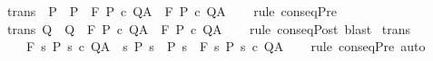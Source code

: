 \begin{isabellebody}
%
\isadelimproof
\isanewline
%
\endisadelimproof
\isanewline
{}\isamarkupfalse%
\ {\isacharbrackleft}trans{\isacharbrackright}\ {\isacharcolon}\ {\isachardoublequoteopen}P{\isacharprime}\ {\isasymsubseteq}\ P\ {\isasymLongrightarrow}\ {\isasymGamma}{\isacharcomma}{\isasymTheta}{\isasymturnstile}\isactrlbsub {\isacharslash}F\isactrlesub \ P\ c\ Q{\isacharcomma}A\ {\isasymLongrightarrow}\ {\isasymGamma}{\isacharcomma}{\isasymTheta}{\isasymturnstile}\isactrlbsub {\isacharslash}F\isactrlesub \ P{\isacharprime}\ c\ Q{\isacharcomma}A{\isachardoublequoteclose}\isanewline
%
\isadelimproof
\ \ %
\endisadelimproof
%
\isatagproof
{}\isamarkupfalse%
\ {\isacharparenleft}rule\ conseqPre{\isacharparenright}%
\endisatagproof
{\isafoldproof}%
%
\isadelimproof
\isanewline
%
\endisadelimproof
\ \isanewline
{}\isamarkupfalse%
\ {\isacharbrackleft}trans{\isacharbrackright}{\isacharcolon}\ {\isachardoublequoteopen}Q\ {\isasymsubseteq}\ Q{\isacharprime}\ {\isasymLongrightarrow}\ {\isasymGamma}{\isacharcomma}{\isasymTheta}{\isasymturnstile}\isactrlbsub {\isacharslash}F\isactrlesub \ P\ c\ Q{\isacharcomma}A\ {\isasymLongrightarrow}\ {\isasymGamma}{\isacharcomma}{\isasymTheta}{\isasymturnstile}\isactrlbsub {\isacharslash}F\isactrlesub \ P\ c\ Q{\isacharprime}{\isacharcomma}A{\isachardoublequoteclose}\isanewline
%
\isadelimproof
\ \ %
\endisadelimproof
%
\isatagproof
{}\isamarkupfalse%
\ {\isacharparenleft}rule\ conseqPost{\isacharparenright}\ blast{\isacharplus}%
\endisatagproof
{\isafoldproof}%
%
\isadelimproof
\isanewline
%
\endisadelimproof
\isanewline
{}\isamarkupfalse%
\ {\isacharbrackleft}trans{\isacharbrackright}{\isacharcolon}\isanewline
\ \ \ \ {\isachardoublequoteopen}{\isasymGamma}{\isacharcomma}{\isasymTheta}{\isasymturnstile}\isactrlbsub {\isacharslash}F\isactrlesub \ {\isacharbraceleft}s{\isachardot}\ P\ s{\isacharbraceright}\ c\ Q{\isacharcomma}A\ {\isasymLongrightarrow}\ {\isacharparenleft}{\isasymAnd}s{\isachardot}\ P{\isacharprime}\ s\ {\isasymlongrightarrow}\ P\ s{\isacharparenright}\ {\isasymLongrightarrow}\ {\isasymGamma}{\isacharcomma}{\isasymTheta}{\isasymturnstile}\isactrlbsub {\isacharslash}F\isactrlesub \ {\isacharbraceleft}s{\isachardot}\ P{\isacharprime}\ s{\isacharbraceright}\ c\ Q{\isacharcomma}A{\isachardoublequoteclose}\isanewline
%
\isadelimproof
\ \ %
\endisadelimproof
%
\isatagproof
{}\isamarkupfalse%
\ {\isacharparenleft}rule\ conseqPre{\isacharparenright}\ auto%
\endisatagproof
{\isafoldproof}%
%
\isadelimproof
\isanewline
%
\endisadelimproof
\isanewline
{}\isamarkupfalse%

\end{isabellebody}
